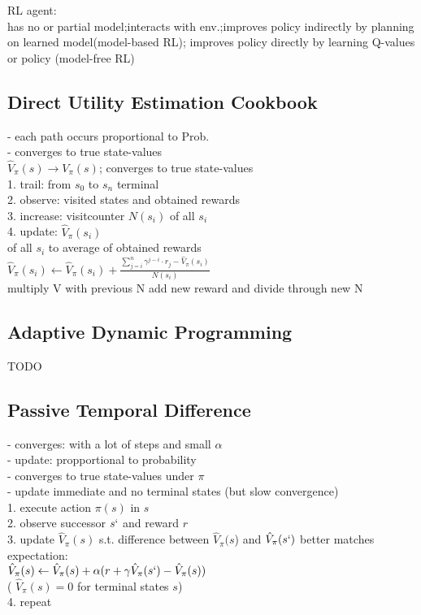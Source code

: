 RL agent: \\ 
has no or partial model;interacts with env.;improves policy indirectly by planning on learned model(model-based RL); improves policy directly by learning Q-values or policy (model-free RL) 

\subsection*{Direct Utility Estimation Cookbook}
- each path occurs proportional to Prob. \\
- converges to true state-values \\
$\hat{V}_{\pi}(s) \rightarrow {V}_{\pi}(s)$; converges to true state-values \\ 
1. trail: from $s_0$ to $s_n$ terminal \\
2. observe: visited states and obtained rewards \\
3. increase: visitcounter $N(s_i)$ of all $s_i$\\
4. update: $\hat{V}_{\pi}(s_i)$\\ of all $s_i$ to average of obtained rewards \\
$\hat{V}_{\pi}(s_i) \leftarrow \hat{V}_{\pi}(s_i) + \frac{\sum^{n}_{j=i} \gamma^{j-i} \cdot r_j - \hat{V}_{\pi}(s_i)}{N(s_i)}$ \\
multiply V with previous N add new reward and divide through new N

\subsection*{Adaptive Dynamic Programming}
TODO

\subsection*{Passive Temporal Difference}
- converges: with a lot of steps and small $\alpha$ \\
- update: propportional to probability \\
- converges to true state-values under $\pi$ \\
- update immediate and no terminal states (but slow convergence) \\
1. execute action $\pi(s)$ in $s$ \\
2. observe successor $s`$ and reward $r$ \\
3. update $\hat{V}_{\pi}(s)$ s.t. difference between $\hat{V}_{\pi} (s$) and $\hat{V}_{\pi}(s`)$ better matches expectation: \\
$\hat{V}_{\pi} (s) \leftarrow \hat{V}_{\pi} (s)+\alpha(r + \gamma \hat{V}_{\pi} (s`) - \hat{V}_{\pi} (s))$ \\
( $\hat{V}_{\pi} (s) = 0$ for terminal states $s$) \\
4. repeat

